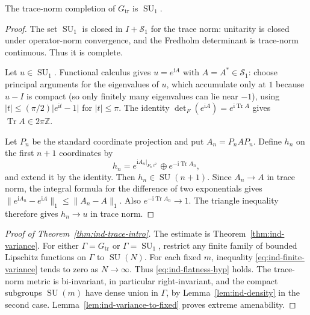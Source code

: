 \begin{lemma}\label{lem:ind-density}
The trace-norm completion of $G_{\mathrm{tr}}$ is $\operatorname{SU}_1$.
\end{lemma}

\begin{proof}
The set $\operatorname{SU}_1$ is closed in $I+\mathcal S_1$ for the trace norm:
unitarity is closed under operator-norm convergence, and the
Fredholm determinant is trace-norm continuous. Thus it is complete.

Let $u\in\operatorname{SU}_1$. Functional calculus gives $u=e^{\mathrm iA}$
with $A=A^*\in\mathcal S_1$: choose principal arguments for the eigenvalues
of $u$, which accumulate only at $1$ because $u-I$ is compact
(so only finitely many eigenvalues can lie near $-1$), using
$\lvert t\rvert\le(\pi/2)\lvert e^{\mathrm it}-1\rvert$ for $\lvert t\rvert\le\pi$.
The identity $\det_F(e^{\mathrm iA})=e^{\mathrm i\operatorname{Tr} A}$ gives
$\operatorname{Tr} A\in2\pi\mathbb Z$.

Let $P_n$ be the standard coordinate projection and put
$A_n=P_nAP_n$. Define $h_n$ on the first $n+1$ coordinates by
\[
h_n=e^{\mathrm iA_n|_{P_n\ell^2}}
\oplus e^{-\mathrm i\operatorname{Tr} A_n},
\]
and extend it by the identity. Then $h_n\in\operatorname{SU}(n+1)$.
Since $A_n\to A$ in trace norm, the integral formula for the
difference of two exponentials gives
$\lVert e^{\mathrm iA_n}-e^{\mathrm iA}\rVert_1\le\lVert A_n-A\rVert_1$.
Also $e^{-\mathrm i\operatorname{Tr} A_n}\to1$. The triangle inequality therefore
gives $h_n\to u$ in trace norm.
\end{proof}

\begin{proof}[Proof of Theorem~\ref{thm:ind-trace-intro}]
The estimate is Theorem~\ref{thm:ind-variance}. For either
$\Gamma=G_{\mathrm{tr}}$ or $\Gamma=\operatorname{SU}_1$, restrict any finite
family of bounded Lipschitz functions on $\Gamma$ to $\operatorname{SU}(N)$.
For each fixed $m$, inequality \eqref{eq:ind-finite-variance} tends to
zero as $N\to\infty$. Thus \eqref{eq:ind-flatness-hyp} holds.
The trace-norm metric is bi-invariant, in particular right-invariant,
and the compact subgroups
$\operatorname{SU}(m)$ have dense union in $\Gamma$, by Lemma~\ref{lem:ind-density} in
the second case. Lemma~\ref{lem:ind-variance-to-fixed} proves extreme
amenability.
\end{proof}


